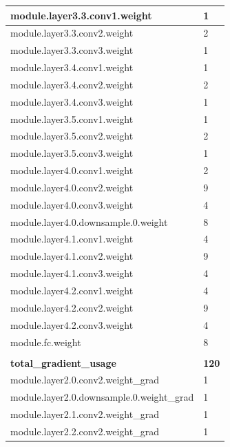 \documentclass[12pt,letterpaper]{article}
\begin{document}
\begin{appendices}
\begin{longtable}{@{}ll@{}}
module.layer3.3.conv1.weight              & 1    \\ \midrule
module.layer3.3.conv2.weight              & 2    \\ \midrule
module.layer3.3.conv3.weight              & 1    \\ \midrule
module.layer3.4.conv1.weight              & 1    \\ \midrule
module.layer3.4.conv2.weight              & 2    \\ \midrule
module.layer3.4.conv3.weight              & 1    \\ \midrule
module.layer3.5.conv1.weight              & 1    \\ \midrule
module.layer3.5.conv2.weight              & 2    \\ \midrule
module.layer3.5.conv3.weight              & 1    \\ \midrule
module.layer4.0.conv1.weight              & 2    \\ \midrule
module.layer4.0.conv2.weight              & 9    \\ \midrule
module.layer4.0.conv3.weight              & 4    \\ \midrule
module.layer4.0.downsample.0.weight       & 8    \\ \midrule
module.layer4.1.conv1.weight              & 4    \\ \midrule
module.layer4.1.conv2.weight              & 9    \\ \midrule
module.layer4.1.conv3.weight              & 4    \\ \midrule
module.layer4.2.conv1.weight              & 4    \\ \midrule
module.layer4.2.conv2.weight              & 9    \\ \midrule
module.layer4.2.conv3.weight              & 4    \\ \midrule
module.fc.weight                          & 8    \\ \midrule
                                          &      \\ \midrule
\textbf{total\_gradient\_usage}           & \textbf{120}  \\ \midrule
module.layer2.0.conv2.weight\_grad        & 1    \\ \midrule
module.layer2.0.downsample.0.weight\_grad & 1    \\ \midrule
module.layer2.1.conv2.weight\_grad        & 1    \\ \midrule
module.layer2.2.conv2.weight\_grad        & 1    \\ \midrule

\end{longtable}
\end{appendices}
\end{document}
